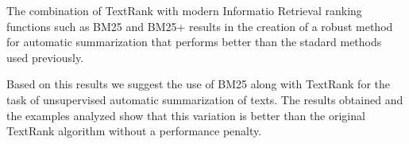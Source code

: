 \documentclass{llncs}
\begin{document}
The combination of TextRank with modern Informatio Retrieval ranking functions such as BM25 and BM25+ results in the creation of a robust method for automatic summarization that performs better than the stadard methods used previously. 

Based on this results we suggest the use of BM25 along with TextRank for the task of unsupervised automatic summarization of texts. The results obtained and the examples analyzed show that this variation is better than the original TextRank algorithm without a performance penalty.
{}

\end{document}
